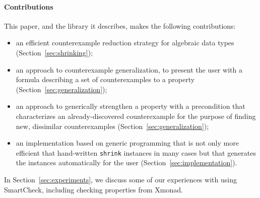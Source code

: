 \documentclass[10pt]{sigplanconf}
\newcommand{\ttp}[1]{\texttt{#1}}
\begin{document}

\paragraph{Contributions}
This paper, and the library it describes, makes the following contributions:

\begin{itemize}

\item an efficient counterexample reduction strategy for algebraic
  data types (Section~\ref{sec:shrinking});

\item an approach to counterexample generalization, to present the user with a
  formula describing a set of counterexamples to a property
  (Section~\ref{sec:generalization});

\item an approach to generically strengthen a property with a precondition that
  characterizes an already-discovered counterexample for the purpose of finding
  new, dissimilar counterexamples (Section~\ref{sec:generalization});

\item an implementation based on generic programming that is not only more
  efficient that hand-written \ttp{shrink} instances in many cases but that
  generates the instances automatically for the user
  (Section~\ref{sec:implementation}).

\end{itemize}

\noindent
In Section~\ref{sec:experiments}, we discuss some of our experiences with using
SmartCheck, including checking properties from Xmonad.

\end{document}
